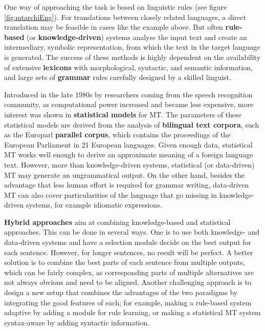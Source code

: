 \begin{multicols}{2}
One way of approaching the task is based on linguistic rules (see figure \ref{fig:mtarchiEng}). For
translations between closely related languages, a direct translation
may be feasible in cases like the example above. But often {\bf rule-based}
(or {\bf knowledge-driven}) systems analyse the input text and create an
intermediary, symbolic representation, from which the text in the
target language is generated. The success of these methods is highly
dependent on the availability of extensive {\bf lexicons} with
morphological, syntactic, and semantic information, and large sets of
{\bf grammar} rules carefully designed by a skilled linguist.

Introduced in the late 1980s by researchers coming from the speech
recognition community, as computational power increased and became
less expensive, more interest was shown in {\bf statistical models} for
MT. The parameters of these statistical models are derived from the
analysis of {\bf bilingual text corpora}, such as the Europarl {\bf parallel
corpus}, which contains the proceedings of the European Parliament in
21 European languages. Given enough data, statistical MT works well
enough to derive an approximate meaning of a foreign language
text. However, more than knowledge-driven systems, statistical (or
data-driven) MT may generate an ungrammatical output. On the other
hand, besides the advantage that less human effort is required for
grammar writing, data-driven MT can also cover particularities of the
language that go missing in knowledge-driven systems, for example
idiomatic expressions.

{\bf Hybrid approaches} aim at combining knowledge-based and statistical
approaches. This can be done in several ways. One is to use both
knowledge- and data-driven systems and have a selection module decide
on the best output for each sentence. However, for longer sentences,
no result will be perfect. A better solution is to combine the best
parts of each sentence from multiple outputs, which can be fairly
complex, as corresponding parts of multiple alternatives are not
always obvious and need to be aligned. Another challenging approach is
to design a new setup that combines the advantages of the two
paradigms by integrating the good features of each; for example,
making a rule-based system adaptive by adding a module for rule
learning, or making a statistical MT system syntax-aware by adding
syntactic information.


\end{multicols}
